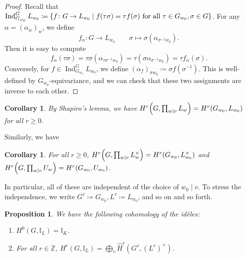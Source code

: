 \documentclass[leqno, openany]{memoir}
\newtheorem{cor}[thm]{Corollary}
\newtheorem{prop}[thm]{Proposition}
\theoremstyle{definition}
\theoremstyle{remark}
\theoremstyle{plain}
\theoremstyle{definition}
\theoremstyle{remark}
\newcommand{\Z}{\mathbb{Z}}
\newcommand{\I}{\mathbb{I}}
\newcommand{\wh}[1]{\widehat{#1}}
\DeclareMathOperator{\Ind}{Ind}
\begin{document}
\begin{proof} Recall that $\Ind_{G_{w_0}}^G L_{w_0} \coloneqq \qty{f \colon G
    \to L_{w_0} \mid f(\tau \sigma) = \tau f(\sigma)\text{ for all }\tau \in
G_{w_0}, \sigma \in G}$. For any $\alpha = {(\alpha_w)}_w$, we define \[
f_{\alpha} \colon G \to L_{w_0} \qquad \sigma \mapsto
\sigma(\alpha_{\sigma^{-1} w_0}). \] Then it is easy to compute \[
f_{\alpha}(\tau \sigma) = \tau \sigma (\alpha_{\tau \sigma^{-1} w_0}) = \tau
(\sigma \alpha_{\sigma^{-1} w_0}) = \tau f_{\alpha}(\sigma). \] Conversely, for
$f \in \Ind_{G_{w_0}}^G L_{w_0}$, we define ${(\alpha_f)}_{\sigma w_0}
\coloneqq \sigma f(\sigma^{-1})$. This is well-defined by
$G_{w_0}$-equivariance, and we can check that these two assignments are inverse
to each other.  \end{proof}

\begin{cor} By Shapiro's lemma, we have $H^r\qty(G, \prod_{w \mid v} L_w) =
H^r(G_{w_0}, L_{w_0})$ for all $r \geq 0$.  \end{cor}

Similarly, we have \begin{cor} For all $r \geq 0$, $H^r\qty(G, \prod_{w \mid v}
L_w^{\times}) = H^r(G_{w_0}, L_{w_0}^{\times})$ and $H^r\qty(G, \prod_{w \mid
v} U_w) = H^r(G_{w_0}, U_{w_0})$.  \end{cor}

In particular, all of these are independent of the choice of $w_0 \mid v$. To
stress the independence, we write $G^v \coloneqq G_{w_0}, L^v \coloneqq
L_{w_0}$, and so on and so forth. 

\begin{prop}\leavevmode We have the following cohomology of the id\`eles:
\begin{enumerate} \item $H^0(G, \I_L) = \I_K$.  \item For all $r \in \Z$,
$H^r(G, \I_L) = \bigoplus_v \wh{H}^r(G^v, {(L^v)}^{\times})$.  \end{enumerate}
\end{prop}
\end{document}
